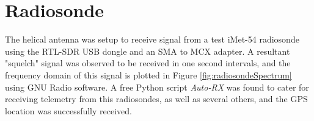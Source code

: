 \graphicspath{{./figures}}

\section{Radiosonde}

The helical antenna was setup to receive signal from a test iMet-54 radiosonde using the RTL-SDR USB dongle and an SMA to MCX adapter. A resultant "squelch" signal was observed to be received in one second intervals, and the frequency domain of this signal is plotted in Figure \ref{fig:radiosondeSpectrum} using GNU Radio software. A free Python script \textit{Auto-RX} was found to cater for receiving telemetry from this radiosondes, as well as several others, and the GPS location was successfully received.
